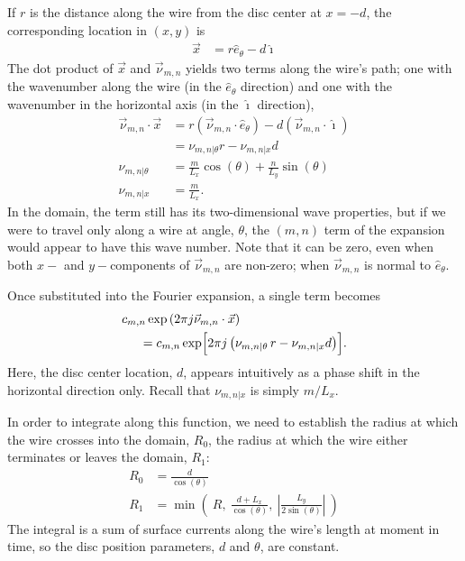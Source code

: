 \documentclass{article}
\def\x{\vec{x}}
\def\eth{\hat{e}_\theta}
\def\vnu{\vec{\nu}_{m,n}}
\def\nuth{\nu_{m,n|\theta}}
\def\ui{\hat{\imath}}
\begin{document}
If $r$ is the distance along the wire from the disc center at $x=-d$, the corresponding location in $(x,y)$ is
\begin{align}
\x &= r \eth - d \ui
\end{align}
The dot product of $\x$ and $\vnu$ yields two terms along the wire's path; one with the wavenumber along the wire (in the $\eth$ direction) and one with the wavenumber in the horizontal axis (in the $\ui$ direction),
\begin{align}
\vnu \cdot \x &= r (\vnu \cdot \hat{e}_\theta) - d (\vnu \cdot \ui)\nonumber\\
 &= \nu_{m,n|\theta} r - \nu_{m,n|x} d\\
\nu_{m,n|\theta} &= \frac{m}{L_x} \cos(\theta) + \frac{n}{L_y} \sin(\theta)\\
\nu_{m,n|x} &= \frac{m}{L_x}.
\end{align}
In the domain, the term still has its two-dimensional wave properties, but if we were to travel only along a wire at angle, $\theta$, the $(m,n)$ term of the expansion would appear to have this wave number.  Note that it can be zero, even when both $x-$ and $y-$components of $\vnu$ are non-zero; when $\vnu$ is normal to $\eth$.

Once substituted into the Fourier expansion, a single term becomes
\begin{align*}
c_{m,n} \exp\left(2\pi j \vnu \cdot \x \right)\hspace{-8em}&\\
&= c_{m,n} \exp\Bigl[2\pi j \left(\nuth\,r - \nu_{m,n|x} d\right)\Bigr].
\end{align*}
Here, the disc center location, $d$, appears intuitively as a phase shift in the horizontal direction only.  Recall that $\nu_{m,n|x}$ is simply $m / L_x$.

In order to integrate along this function, we need to establish the radius at which the wire crosses into the domain, $R_0$, the radius at which the wire either terminates or leaves the domain, $R_1$:
\begin{align}
R_0 &= \frac{d}{\cos(\theta)}\\
R_1 &= \min\left(\ R,\ \frac{d + L_x}{\cos(\theta)},\ \left|\frac{L_y}{2\sin(\theta)}\right|\ \right)
\end{align}
The integral is a sum of surface currents along the wire's length at moment in time, so the disc position parameters, $d$ and $\theta$, are constant.
\end{document}
